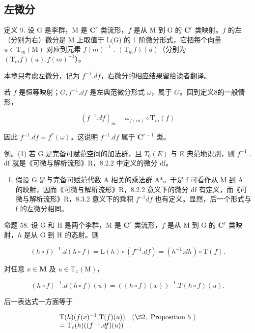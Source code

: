 \subsection{左微分}

定义 9. 设 G 是李群，M 是 \(\mathbf{C}^r\) 类流形，\(f\) 是从 M 到 G 的 \(\mathbf{C}^r\) 类映射。\(f\) 的左（分别为右）微分是 M 上取值于 L(G) 的 1 阶微分形式，它把每个向量 \(u \in \mathrm{T}_m(\mathrm{M})\) 对应到元素 \(f(m)^{-1}\) . \((\mathrm{T}_m f)(u)\)（分别为 \((\mathrm{T}_m f)(u). f(m)^{-1}\)）。

本章只考虑左微分，记为 \(f^{-1}.df\)，右微分的相应结果留给读者翻译。

若 \(f\) 是恒等映射；\(G, f^{-1}.df\) 是左典范微分形式 \(\omega\)，属于 \(G\)。回到定义8的一般情形，

\[
(f ^ {- 1}. d f) _ {m} = \omega_ {f (m)} \circ \mathrm{T} _ {m} (f)
\]

因此 \(f^{-1}.df = f^{*}(\omega)\)。这说明 \(f^{-1}.df\) 属于 \(\mathbf{C}^{r - 1}\) 类。

例。(1) 若 G 是完备可赋范空间的加法群，且 \(T_{0}(E)\) 与 E 典范地识别，则 \(f^{-1}\) . df 就是《可微与解析流形》R，8.2.2 中定义的微分 df。

\begin{enumerate}
\def\labelenumi{(\arabic{enumi})}
\setcounter{enumi}{1}
\tightlist
\item
  假设 G 是与完备可赋范代数 A 相关的乘法群 A*。于是 f 可看作从 M 到 A 的映射，因而《可微与解析流形》R，8.2.2 意义下的微分 df 有定义，而《可微与解析流形》R，8.3.2 意义下的乘积 \(f^{-1}df\) 也有定义。显然，后一个形式与 f 的左微分相同。
\end{enumerate}

命题 58. 设 G 和 H 是两个李群，M 是 \(\mathbf{C}^r\) 类流形，\(f\) 是从 M 到 G 的 \(\mathbf{C}^r\) 类映射，\(h\) 是从 G 到 H 的态射。则

\[
(h \circ f) ^ {- 1}. d (h \circ f) = \mathrm{L} (h) \circ (f ^ {- 1}. d f) = (h ^ {- 1}. d h) \circ \mathrm{T} (f).
\]

对任意 \(x \in \mathbf{M}\) 及 \(u \in \mathrm{T}_x(\mathrm{M})\)，

\[
(h \circ f) ^ {- 1}. d (h \circ f) (u) = ((h \circ f) (x)) ^ {- 1}. T (h \circ f) (u).
\]

后一表达式一方面等于

\[
\begin{array}{l l} \mathrm{T} (h) (f (x) ^ {- 1}. \mathrm{T} (f) (u)) & (\S 2, \text { Proposition   5 }) \\ = \mathrm{T} _ {e} (h) ((f ^ {- 1}. d f) (u)) \end{array}
\]

